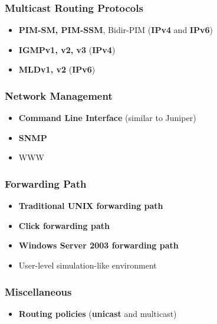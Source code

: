 \documentclass[11pt]{article}
\begin{document}
\subsubsection*{Multicast Routing Protocols}

\begin{itemize}
  \item {\bf PIM-SM, PIM-SSM}, Bidir-PIM ({\bf IPv4} and {\bf IPv6})
  \item {\bf IGMPv1, v2, v3} ({\bf IPv4})
  \item {\bf MLDv1, v2} ({\bf IPv6})
\end{itemize}

\subsubsection*{Network Management}

\begin{itemize}
  \item {\bf Command Line Interface} (similar to Juniper)
  \item {\bf SNMP}
  \item WWW
\end{itemize}

\subsubsection*{Forwarding Path}

\begin{itemize}
  \item {\bf Traditional UNIX forwarding path}
  \item {\bf Click forwarding path}
  \item {\bf Windows Server 2003 forwarding path}
  \item User-level simulation-like environment
\end{itemize}

\subsubsection*{Miscellaneous}

\begin{itemize}
  \item {\bf Routing policies} ({\bf unicast} and multicast)
\end{itemize}

\end{document}
